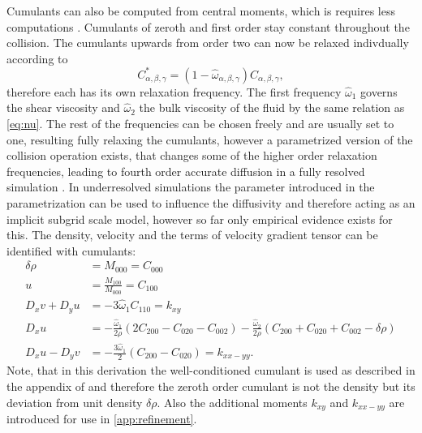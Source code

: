 Cumulants can also be computed from central moments, which is requires less computations \cite{geier_cumulant_2015}. Cumulants of zeroth and first order stay constant throughout the collision. The cumulants upwards from order two can now be relaxed indivdually according to
\begin{equation}
	C_{\alpha, \beta, \gamma}^* = \left(1-\hat{\omega}_{\alpha,\beta,\gamma}\right) C_{\alpha, \beta, \gamma}, \label{eq:relax}
\end{equation}
therefore each has its own relaxation frequency. The first frequency $\hat{\omega}_1$ governs the shear viscosity and $\hat{\omega}_2$ the bulk viscosity of the fluid by the same relation as \eqref{eq:nu}. The rest of the frequencies can be chosen freely and are usually set to one, resulting fully relaxing the cumulants, however a parametrized version of the collision operation exists, that changes some of the higher order relaxation frequencies, leading to fourth order accurate diffusion in a fully resolved simulation \cite{geier_parametrization_2017}. In underresolved simulations the parameter introduced in the parametrization can be used to influence the diffusivity and therefore acting as an implicit subgrid scale model, however so far only empirical evidence exists for this.\cite{geier_cumulant_2015}
The density, velocity and the terms of velocity gradient tensor can be identified with cumulants:
\begin{align}
\delta \rho &= M_{000} = C_{000} \label{eq:drho}\\
u &= \frac{M_{100}}{M_{000}} =  C_{100}\\
D_x v + D_y u &= -3 \hat{\omega}_1 C_{110} = k_{xy} \label{eq:derivate1}\\
D_x u &= - \frac{\hat{\omega}_1}{2 \rho}\left(2 C_{200} - C_{020} - C_{002} \right) - \frac{\hat{\omega}_2}{2 \rho} \left(C_{200} + C_{020} + C_{002} - \delta \rho \right) \\
D_x u - D_y v &= - \frac{3\hat{\omega}_1}{2} \left(C_{200} - C_{020}\right) = k_{xx-yy}. \label{eq:derivative2}
\end{align} Note, that in this derivation the well-conditioned cumulant is used as described in the appendix of \cite{geier_cumulant_2015} and therefore the zeroth order cumulant is not the density but its deviation from unit density $\delta \rho$. Also the additional moments $k_{xy}$ and $k_{xx-yy}$ are introduced for use in \autoref{app:refinement}.
